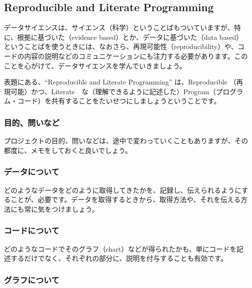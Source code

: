\documentclass[
]{bxjsbook}
\theoremstyle{definition}
\theoremstyle{definition}
\theoremstyle{definition}
\theoremstyle{definition}
\theoremstyle{remark}
\begin{document}
\hypertarget{reproducible-and-literate-programming}{%
\subsection{Reproducible and Literate Programming}\label{reproducible-and-literate-programming}}

データサイエンスは、サイエンス（科学）ということばもついていますが、特に、根拠に基づいた（evidence based）とか、データに基づいた（data based）ということばを使うときには、なおさら、再現可能性（reproducibility）や、コードの内容の説明などのコミュニケーションにも注力する必要があります。このことを心がけて、データサイエンスを学んでいきましょう。

表題にある、``Reproducible and Literate Programming'' は、Reproducible （再現可能）かつ、Literate　な（理解できるように記述した）Program（プログラム・コード）を共有することをたいせつにしましょうということです。

\hypertarget{ux76eeux7684ux554fux3044ux306aux3069}{%
\subsubsection{目的、問いなど}\label{ux76eeux7684ux554fux3044ux306aux3069}}

プロジェクトの目的、問いなどは、途中で変わっていくこともありますが、その都度に、メモをしておくと良いでしょう。

\hypertarget{ux30c7ux30fcux30bfux306bux3064ux3044ux3066}{%
\subsubsection{データについて}\label{ux30c7ux30fcux30bfux306bux3064ux3044ux3066}}

どのようなデータをどのように取得してきたかを、記録し、伝えられるようにすることが、必要です。データを取得するときから、取得方法や、それを伝える方法にも常に気をつけましょう。

\hypertarget{ux30b3ux30fcux30c9ux306bux3064ux3044ux3066}{%
\subsubsection{コードについて}\label{ux30b3ux30fcux30c9ux306bux3064ux3044ux3066}}

どのようなコードでそのグラフ（chart）などが得られたかも、単にコードを記述するだけでなく、それぞれの部分に、説明を付与することも有効です。

\hypertarget{ux30b0ux30e9ux30d5ux306bux3064ux3044ux3066}{%
\subsubsection{グラフについて}\label{ux30b0ux30e9ux30d5ux306bux3064ux3044ux3066}}
\end{document}
